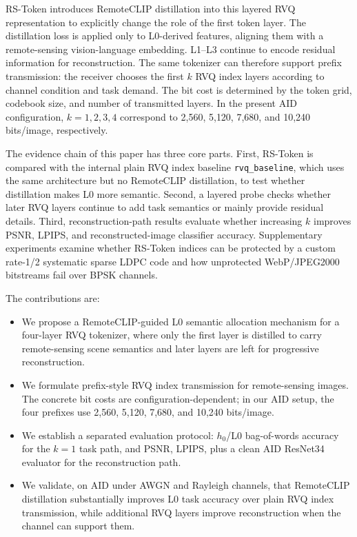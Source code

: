 \documentclass[lettersize,journal]{IEEEtran}
\begin{document}
RS-Token introduces RemoteCLIP distillation into this layered RVQ representation to explicitly change the role of the first token layer. The distillation loss is applied only to L0-derived features, aligning them with a remote-sensing vision-language embedding. L1--L3 continue to encode residual information for reconstruction. The same tokenizer can therefore support prefix transmission: the receiver chooses the first $k$ RVQ index layers according to channel condition and task demand. The bit cost is determined by the token grid, codebook size, and number of transmitted layers. In the present AID configuration, $k=1,2,3,4$ correspond to 2{,}560, 5{,}120, 7{,}680, and 10{,}240 bits/image, respectively.

The evidence chain of this paper has three core parts. First, RS-Token is compared with the internal plain RVQ index baseline \texttt{rvq\_baseline}, which uses the same architecture but no RemoteCLIP distillation, to test whether distillation makes L0 more semantic. Second, a layered probe checks whether later RVQ layers continue to add task semantics or mainly provide residual details. Third, reconstruction-path results evaluate whether increasing $k$ improves PSNR, LPIPS, and reconstructed-image classifier accuracy. Supplementary experiments examine whether RS-Token indices can be protected by a custom rate-1/2 systematic sparse LDPC code and how unprotected WebP/JPEG2000 bitstreams fail over BPSK channels.

The contributions are:
\begin{itemize}
    \item We propose a RemoteCLIP-guided L0 semantic allocation mechanism for a four-layer RVQ tokenizer, where only the first layer is distilled to carry remote-sensing scene semantics and later layers are left for progressive reconstruction.
    \item We formulate prefix-style RVQ index transmission for remote-sensing images. The concrete bit costs are configuration-dependent; in our AID setup, the four prefixes use 2{,}560, 5{,}120, 7{,}680, and 10{,}240 bits/image.
    \item We establish a separated evaluation protocol: $h_0$/L0 bag-of-words accuracy for the $k=1$ task path, and PSNR, LPIPS, plus a clean AID ResNet34 evaluator for the reconstruction path.
    \item We validate, on AID under AWGN and Rayleigh channels, that RemoteCLIP distillation substantially improves L0 task accuracy over plain RVQ index transmission, while additional RVQ layers improve reconstruction when the channel can support them.
\end{itemize}
\end{document}
